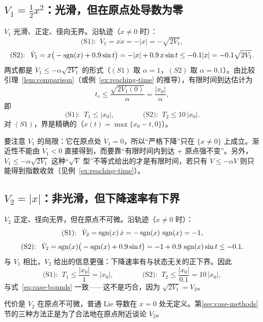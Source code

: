 \subsection{$V_1=\tfrac12x^2$：光滑，但在原点处导数为零}

$V_1$ 光滑、正定、径向无界。沿轨迹（$x\neq0$ 时）：
\[
\text{(S1): }\ \dot V_1=x\dot x=-|x|=-\sqrt{2V_1},
\]
\[
\text{(S2): }\ \dot V_1=x\big(-\operatorname{sgn}(x)+0.9\sin t\big)=-|x|+0.9\,x\sin t\le-0.1|x|=-0.1\sqrt{2V_1}.
\]
两式都是 $\dot V_1\le-\alpha\sqrt{2V_1}$ 的形式（$(S1)$ 取 $\alpha=1$，$(S2)$ 取 $\alpha=0.1$）。由比较引理~\ref{lem:comparison}（或例~\ref{ex:reaching-time} 的推导），有限时间到达估计为
\[
t_r\le\frac{\sqrt{2V_1(0)}}{\alpha}=\frac{|x_0|}{\alpha},
\]
即
\begin{equation}\label{eq:case-bounds}
  \text{(S1): }\ T_1\le|x_0|,
  \qquad\qquad
  \text{(S2): }\ T_2\le10\,|x_0| .
\end{equation}
对 $(S1)$，界是精确的（$x(t)=\max\{x_0-t,0\}$）。

要注意 $V_1$ 的局限：它在原点处 $\dot V_1=0$，所以“严格下降”只在 $\{x\neq0\}$ 上成立。渐近性不能由 $\dot V_1<0$ 直接得到，而要靠“有限时间内到达 + 原点强不变”。另外，$\dot V_1\le-\alpha\sqrt{2V_1}$ 这种“$\sqrt{V}$ 型”不等式给出的才是有限时间，若只有 $\dot V\le-\alpha V$ 则只能得到指数收敛（见例~\ref{ex:reaching-time}）。

\subsection{$V_2=|x|$：非光滑，但下降速率有下界}

$V_2$ 正定、径向无界，但在原点不可微。沿轨迹（$x\neq0$ 时）：
\[
\text{(S1): }\ \dot V_2=\operatorname{sgn}(x)\,\dot x=-\operatorname{sgn}(x)\,\operatorname{sgn}(x)=-1,
\]
\[
\text{(S2): }\ \dot V_2=\operatorname{sgn}(x)\big(-\operatorname{sgn}(x)+0.9\sin t\big)=-1+0.9\,\operatorname{sgn}(x)\sin t\le-0.1 .
\]
与 $V_1$ 相比，$V_2$ 给出的信息更强：下降速率有与状态无关的正下界。因此
\[
\text{(S1): }\ T_1\le\frac{|x_0|}{1}=|x_0|,
\qquad\qquad
\text{(S2): }\ T_2\le\frac{|x_0|}{0.1}=10\,|x_0|,
\]
与式~\eqref{eq:case-bounds} 一致——这不是巧合，因为 $\sqrt{2V_1}=V_2$。

代价是 $V_2$ 在原点不可微，普通 Lie 导数在 $x=0$ 处无定义。第\ref{sec:case-methods}节的三种方法正是为了合法地在原点附近谈论 $\dot V_2$。

